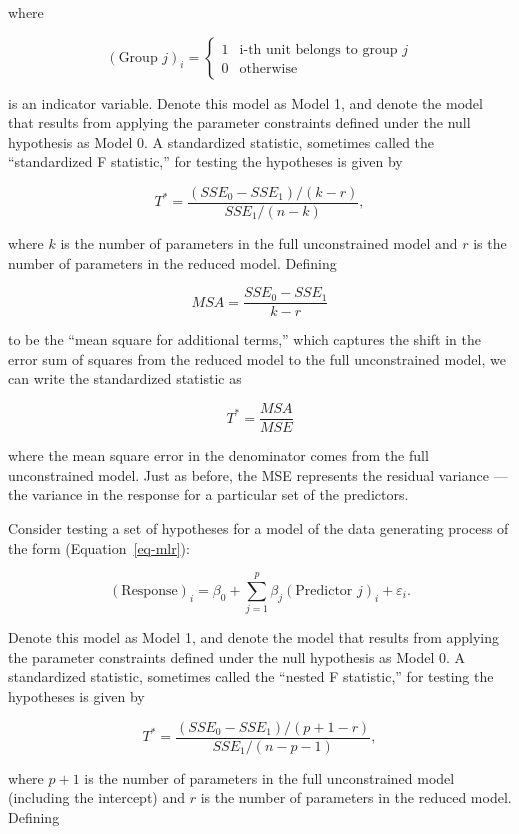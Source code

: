 \documentclass[
  letterpaper,
  DIV=11,
  numbers=noendperiod]{scrreprt}
\providecommand{\tightlist}{%
  \setlength{\itemsep}{0pt}\setlength{\parskip}{0pt}}\usepackage{longtable,booktabs,array}
\theoremstyle{plain}
\theoremstyle{definition}
\theoremstyle{definition}
\theoremstyle{remark}
\begin{document}
where

\[(\text{Group } j)_i = \begin{cases} 1 & \text{i-th unit belongs to group } j \\ 0 & \text{otherwise} \end{cases}\]

is an indicator variable. Denote this model as Model 1, and denote the
model that results from applying the parameter constraints defined under
the null hypothesis as Model 0. A standardized statistic, sometimes
called the ``standardized F statistic,'' for testing the hypotheses is
given by

\[T^* = \frac{\left(SSE_0 - SSE_1\right) / (k - r)}{SSE_1 / (n - k)},\]

where \(k\) is the number of parameters in the full unconstrained model
and \(r\) is the number of parameters in the reduced model. Defining

\[MSA = \frac{SSE_0 - SSE_1}{k - r}\]

to be the ``mean square for additional terms,'' which captures the shift
in the error sum of squares from the reduced model to the full
unconstrained model, we can write the standardized statistic as

\[T^* = \frac{MSA}{MSE}\]

where the mean square error in the denominator comes from the full
unconstrained model. Just as before, the MSE represents the residual
variance --- the variance in the response for a particular set of the
predictors.

\begin{description}
\tightlist
\item[Standardized Statistic for General Linear Model
(Definition~\ref{def-general-f})]
Consider testing a set of hypotheses for a model of the data generating
process of the form (Equation~\ref{eq-mlr}):
\end{description}

\[(\text{Response})_i = \beta_0 + \sum_{j=1}^{p} \beta_j(\text{Predictor } j)_i + \varepsilon_i.\]

Denote this model as Model 1, and denote the model that results from
applying the parameter constraints defined under the null hypothesis as
Model 0. A standardized statistic, sometimes called the ``nested F
statistic,'' for testing the hypotheses is given by

\[T^* = \frac{\left(SSE_0 - SSE_1\right) / (p + 1 - r)}{SSE_1 / (n - p - 1)},\]

where \(p + 1\) is the number of parameters in the full unconstrained
model (including the intercept) and \(r\) is the number of parameters in
the reduced model. Defining
\end{document}
